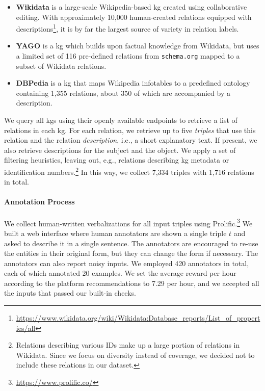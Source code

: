 \begin{itemize}
    \item \textbf{Wikidata} \cite{vrandevcic2014wikidata} is a large-scale Wikipedia-based \ac{kg} created using collaborative editing. With approximately 10,000 human-created relations equipped with descriptions\footnote{\url{https://www.wikidata.org/wiki/Wikidata:Database_reports/List_of_properties/all}}, it is by far the largest source of variety in relation labels.
    \item \textbf{YAGO} \cite{pellissier2020yago} is a \ac{kg} which builds upon factual knowledge from Wikidata, but uses a limited set of 116 pre-defined relations from \texttt{schema.org} \cite{guha2016schema} mapped to a subset of Wikidata relations.
    \item \textbf{DBPedia} \cite{auer2007dbpedia,lehmann2015dbpedia} is a \ac{kg} that maps Wikipedia infotables to a predefined ontology containing 1,355 relations, about 350 of which are accompanied by a description.
\end{itemize}

We query all \acp{kg} using their openly available endpoints to retrieve a list of relations in each \ac{kg}. For each relation, we retrieve up to five \textit{triples} that use this relation and the relation \textit{description}, i.e., a short explanatory text.
If present, we also retrieve descriptions for the subject and the object. We apply a set of filtering heuristics, leaving out, e.g., relations describing \ac{kg} metadata or identification numbers.\footnote{Relations describing various IDs make up a large portion of relations in Wikidata. Since we focus on diversity instead of coverage, we decided not to include these relations in our dataset.} In this way, we collect 7,334 triples with 1,716 relations in total.

\paragraph{Annotation Process}
We collect human-written verbalizations for all input triples using Prolific.\footnote{\url{https://www.prolific.co/}} We built a web interface where human annotators are shown a single triple $t$ and asked to describe it in a single sentence. The annotators are encouraged to re-use the entities in their original form, but they can change the form if necessary. The annotators can also report noisy inputs. We employed 420 annotators in total, each of which annotated 20 examples. We set the average reward per hour according to the platform recommendations to  \textsterling{}7.29 per hour, and we accepted all the inputs that passed our built-in checks.

